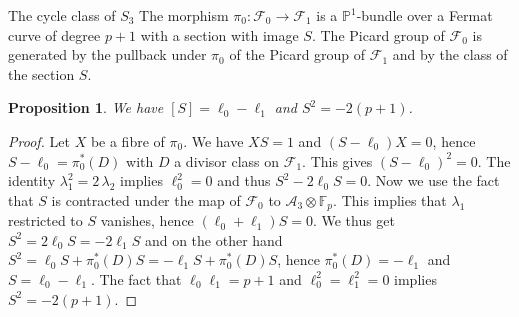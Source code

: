 \documentclass[11pt]{amsart}
\numberwithin{equation}{section}
\newcommand{\FF}{\mathbb F}
\newcommand{\PP}{\mathbb P}
\newtheorem{proposition}[theorem]{Proposition}
\theoremstyle{definition}
\theoremstyle{remark}
\begin{document}
\begin{section}{The cycle class of $S_3$}
The morphism $\pi_0: \mathcal{F}_0 \to \mathcal{F}_1$ is a ${\PP}^1$-bundle over a Fermat curve
of degree $p+1$ with a section with image $S$. 
The Picard group of $\mathcal{F}_0$ is generated by the pullback under $\pi_0$ 
of the Picard group of $\mathcal{F}_1$ and by the
class of the section $S$.

\begin{proposition}
We have $[S]=\ell_0-\ell_1$ and $S^2=-2(p+1)$.
\end{proposition}
\begin{proof}
Let $X$ be a fibre of $\pi_0$. We have  $X S=1$ and $(S-\ell_0)X=0$, hence $S-\ell_0=\pi_0^*(D)$ with
$D$ a divisor class on $\mathcal{F}_1$. This gives $(S-\ell_0)^2=0$.
The identity $\lambda_1^2=2\, \lambda_2$ implies $\ell_0^2=0$ and thus $S^2-2\ell_0S=0$.
Now we use the fact that $S$ is contracted under the map 
of $\mathcal{F}_0$ to $\mathcal{A}_3 \otimes {\FF}_p$.
This implies that $\lambda_1$ restricted to $S$ vanishes, hence $(\ell_0+\ell_1)S=0$.
We thus get $S^2=2\ell_0 S =-2\ell_1 S$ and on the other hand $S^2=\ell_0S+\pi_0^*(D)S=-\ell_1S+\pi_0^*(D)S$,
hence $\pi_0^*(D)=-\ell_1$ and $S=\ell_0-\ell_1$. The fact that $\ell_0\ell_1=p+1$ and $\ell_0^2=\ell_1^2=0$ implies 
$S^2=-2(p+1)$.
\end{proof}
\end{section}
\end{document}
